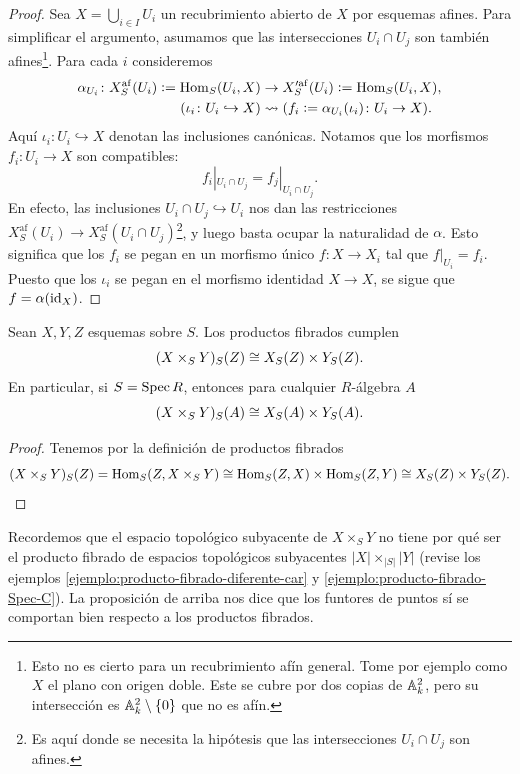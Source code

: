 \documentclass{article}
\numberwithin{equation}{section}
\theoremstyle{definition}
\begin{document}
\begin{teorema}
\begin{proof}
    Sea $X = \bigcup_{i\in I} U_i$ un recubrimiento abierto de $X$ por esquemas
    afines. Para simplificar el argumento, asumamos que las intersecciones
    $U_i\cap U_j$ son también afines\footnote{Esto no es cierto para un
      recubrimiento afín general. Tome por ejemplo como $X$ el plano con origen
      doble. Este se cubre por dos copias de $\AA^2_k$, pero su intersección es
      $\AA^2_k\setminus \{ 0 \}$ que no es afín.}. Para cada $i$ consideremos
    \begin{align*}
      \alpha_{U_i}\colon X_S^\mathrm{af} (U_i) \dfn \Hom_S (U_i, X) & \to X'^{\mathrm{af}}_S (U_i) \dfn \Hom_S (U_i, X),\\
      (\iota_i\colon U_i \hookrightarrow X) & \rightsquigarrow (f_i \dfn \alpha_{U_i} (\iota_i)\colon U_i \to X).
    \end{align*}
    Aquí $\iota_i\colon U_i \hookrightarrow X$ denotan las inclusiones
    canónicas. Notamos que los morfismos $f_i\colon U_i \to X$ son compatibles:
    $$f_i|_{U_i\cap U_j} = f_j|_{U_i\cap U_j}.$$
    En efecto, las inclusiones $U_i \cap U_j \hookrightarrow U_i$ nos dan
    las restricciones
    $X_S^\mathrm{af} (U_i) \to X_S^\mathrm{af} (U_i \cap U_j)$\footnote{Es aquí
      donde se necesita la hipótesis que las intersecciones $U_i\cap U_j$ son
      afines.}, y luego basta ocupar la naturalidad de $\alpha$. Esto significa
    que los $f_i$ se pegan en un morfismo único $f\colon X\to X_i$ tal que
    $f|_{U_i} = f_i$. Puesto que los $\iota_i$ se pegan en el morfismo identidad
    $X\to X$, se sigue que $f = \alpha (\id{X})$.
  \end{proof}
\end{teorema}

\begin{proposicion}
  Sean $X,Y,Z$ esquemas sobre $S$. Los productos fibrados cumplen
  $$(X\times_S Y)_S (Z) \isom X_S (Z) \times Y_S (Z).$$
  En particular, si $S = \Spec R$, entonces para cualquier $R$-álgebra $A$
  $$(X\times_S Y)_S (A) \isom X_S (A) \times Y_S (A).$$

  \begin{proof}
    Tenemos por la definición de productos fibrados
    \[ (X\times_S Y)_S (Z) = \Hom_S (Z, X\times_S Y) \isom
       \Hom_S (Z,X) \times \Hom_S (Z,Y) \isom
       X_S (Z) \times Y_S (Z). \qedhere \]
  \end{proof}
\end{proposicion}

Recordemos que el espacio topológico subyacente de $X\times_S Y$ no tiene por
qué ser el producto fibrado de espacios topológicos subyacentes
$|X| \times_{|S|} |Y|$ (revise los ejemplos
\ref{ejemplo:producto-fibrado-diferente-car} y
\ref{ejemplo:producto-fibrado-Spec-C}). La proposición de arriba nos dice que
los funtores de puntos sí se comportan bien respecto a los productos fibrados.
\end{document}
